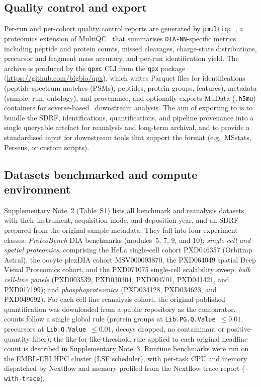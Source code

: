 \documentclass[preprint,12pt]{elsarticle}
\begin{document}
\subsection{Quality control and \qpx{} export}
Per-run and per-cohort quality control reports are generated by \texttt{pmultiqc}~\cite{yue2026pmultiqc}, a proteomics extension of MultiQC~\cite{ewels2016multiqc} that summarises \texttt{DIA-NN}-specific metrics including peptide and protein counts, missed cleavages, charge-state distributions, precursor and fragment mass accuracy, and per-run identification yield. The \qpx{} archive is produced by the \texttt{qpxc} CLI from the \texttt{qpx} package (\url{https://github.com/bigbio/qpx}), which writes Parquet files for identifications (peptide-spectrum matches (PSMs), peptides, protein groups, features), metadata (sample, run, ontology), and provenance, and optionally exports MuData (\texttt{.h5mu}) containers for scverse-based~\cite{virshup2023scverse} downstream analysis. The aim of exporting to \qpx{} is to bundle the SDRF, identifications, quantifications, and pipeline provenance into a single queryable artefact for reanalysis and long-term archival, and to provide a standardised input for downstream tools that support the format (e.g.\ MSstats, Perseus, or custom scripts).

\subsection{Datasets benchmarked and compute environment}
\label{sec:datasets}
Supplementary Note~2 (Table~S1) lists all benchmark and reanalysis datasets with their instrument, acquisition mode, and deposition year, and an SDRF prepared from the original sample metadata. They fall into four experiment classes: \emph{ProteoBench} DIA benchmarks (modules~5, 7, 9, and 10); \emph{single-cell and spatial proteomics}, comprising the HeLa single-cell cohort PXD046357 (Orbitrap Astral), the oocyte plexDIA cohort MSV000093870, the PXD064049 spatial Deep Visual Proteomics cohort, and the PXD071075 single-cell scalability sweep; \emph{bulk cell-line panels} (PXD003539, PXD030304, PXD004701, PXD041421, and PXD017199); and \emph{phosphoproteomics} (PXD034128, PXD034623, and PXD049692).
For each cell-line reanalysis cohort, the original published quantification was downloaded from a public repository as the comparator. \quantmsdiann{} counts follow a single global rule (protein groups at \texttt{Lib.PG.Q.Value}~$\leq 0.01$, precursors at \texttt{Lib.Q.Value}~$\leq 0.01$, decoys dropped, no contaminant or positive-quantity filter); the like-for-like-threshold rule applied to each original headline count is described in Supplementary Note~3. Runtime benchmarks were run on the EMBL-EBI HPC cluster (LSF scheduler), with per-task CPU and memory dispatched by Nextflow and memory profiled from the Nextflow trace report (\texttt{-with-trace}).
\end{document}

